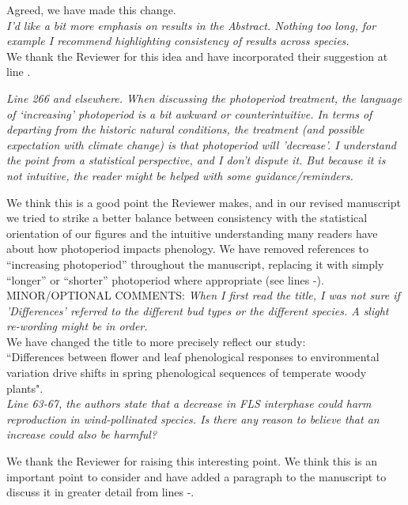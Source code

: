 \documentclass[11pt]{article}
\begin{document}
\noindent Agreed, we have made this change.\\

\emph{I’d like a bit more emphasis on results in the Abstract. Nothing too long, for example I recommend highlighting consistency of results across species.}\\

\noindnet We thank the Reviewer for this idea and have incorporated their suggestion at line .

\emph{Line 266 and elsewhere. When discussing the photoperiod treatment, the language of ‘increasing’ photoperiod is a bit awkward or counterintuitive. In terms of departing from the historic natural conditions, the treatment (and possible expectation with climate change) is that photoperiod will 'decrease'. I understand the point from a statistical perspective, and I don’t dispute it. But because it is not intuitive, the reader might be helped with some guidance/reminders.}

\noindent We think this is a good point the Reviewer makes, and in our revised manuscript we tried to strike a better balance between consistency with the statistical orientation of our figures and the intuitive understanding many readers have about how photoperiod impacts phenology. We have removed references to ``increasing photoperiod'' throughout the manuscript, replacing it with simply ``longer'' or ``shorter'' photoperiod where appropriate (see lines -).\\


MINOR/OPTIONAL COMMENTS:
\emph{When I first read the title, I was not sure if 'Differences' referred to the different bud types or the different species. A slight re-wording might be in order.}\\


\noindent We have changed the title to more precisely reflect our study:\\
``Differences between flower and leaf phenological responses to environmental variation drive shifts in spring phenological sequences of temperate woody plants".\\

\emph{Line 63-67, the authors state that a decrease in FLS interphase could harm reproduction in wind-pollinated species. Is there any reason to believe that an increase could also be harmful?}

\noindent We thank the Reviewer for raising this interesting point. We think this is an important point to consider and have added a paragraph to the manuscript to discuss it in greater detail from lines -. \\
\end{document}
